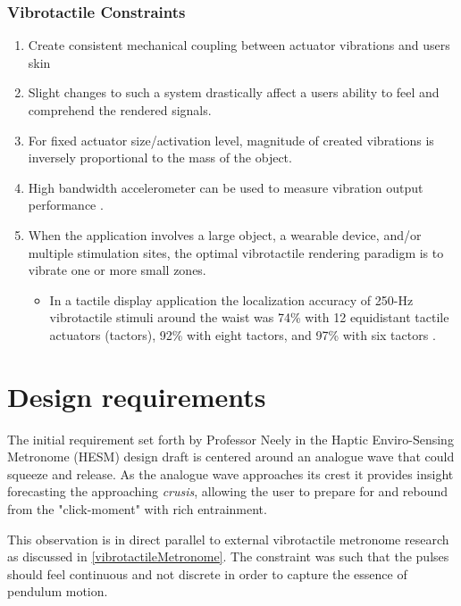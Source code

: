 \subsubsection{Vibrotactile Constraints}
\begin{enumerate}
    \item Create consistent mechanical coupling between actuator vibrations and users skin
    \item Slight changes to such a system drastically affect a users ability to feel and comprehend the rendered signals.
    \item For fixed actuator size/activation level, magnitude of created vibrations is inversely proportional to the mass of the object.
    \item High bandwidth accelerometer can be used to measure vibration output performance \cite{ignoto2017development}.
    \item When the application involves a large object, a wearable device, and/or multiple stimulation sites, the optimal vibrotactile rendering paradigm is to vibrate one or more small zones. 
    \begin{itemize}
    \item In a tactile display application the localization accuracy of 250-Hz vibrotactile stimuli around the waist was 74\% with 12 equidistant tactile actuators (tactors), 92\% with eight tactors, and 97\% with six tactors \cite{choi2013vibrotactile}.
    \end{itemize}
\end{enumerate}

\section{Design requirements} \label{designReq}

The initial requirement set forth by Professor Neely in the Haptic Enviro-Sensing Metronome (HESM) design draft is centered around an analogue wave that could squeeze and release. As the analogue wave approaches its crest it provides insight forecasting the approaching \textit{crusis}, allowing the user to prepare for and rebound from the "click-moment" with rich entrainment. 

This observation is in direct parallel to external vibrotactile metronome research as discussed in \ref{vibrotactileMetronome}. The constraint was such that the pulses should feel continuous and not discrete in order to capture the essence of pendulum motion.

